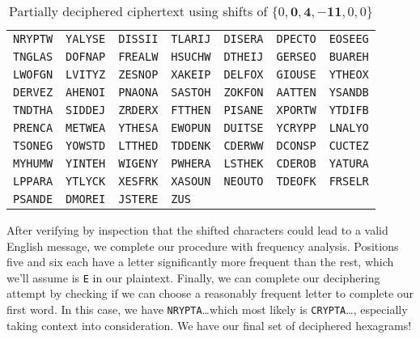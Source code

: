 \documentclass[12pt]{article}
\theoremstyle{remark}  %
\begin{document}
    \begin{table}[h]
        \begin{center}
            \begin{tabular}{lllllll}
                \texttt{NRYPTW} & \texttt{YALYSE} & \texttt{DISSII} & \texttt{TLARIJ} & \texttt{DISERA} & \texttt{DPECTO} & \texttt{EOSEEG} \\
                \texttt{TNGLAS} & \texttt{DOFNAP} & \texttt{FREALW} & \texttt{HSUCHW} & \texttt{DTHEIJ} & \texttt{GERSEO} & \texttt{BUAREH} \\
                \texttt{LWOFGN} & \texttt{LVITYZ} & \texttt{ZESNOP} & \texttt{XAKEIP} & \texttt{DELFOX} & \texttt{GIOUSE} & \texttt{YTHEOX} \\
                \texttt{DERVEZ} & \texttt{AHENOI} & \texttt{PNAONA} & \texttt{SASTOH} & \texttt{ZOKFON} & \texttt{AATTEN} & \texttt{YSANDB} \\
                \texttt{TNDTHA} & \texttt{SIDDEJ} & \texttt{ZRDERX} & \texttt{FTTHEN} & \texttt{PISANE} & \texttt{XPORTW} & \texttt{YTDIFB} \\
                \texttt{PRENCA} & \texttt{METWEA} & \texttt{YTHESA} & \texttt{EWOPUN} & \texttt{DUITSE} & \texttt{YCRYPP} & \texttt{LNALYO} \\
                \texttt{TSONEG} & \texttt{YOWSTD} & \texttt{LTTHED} & \texttt{TDDENK} & \texttt{CDERWW} & \texttt{DCONSP} & \texttt{CUCTEZ} \\
                \texttt{MYHUMW} & \texttt{YINTEH} & \texttt{WIGENY} & \texttt{PWHERA} & \texttt{LSTHEK} & \texttt{CDEROB} & \texttt{YATURA} \\
                \texttt{LPPARA} & \texttt{YTLYCK} & \texttt{XESFRK} & \texttt{XASOUN} & \texttt{NEOUTO} & \texttt{TDEOFK} & \texttt{FRSELR} \\
                \texttt{PSANDE} & \texttt{DMOREI} & \texttt{JSTERE} & \texttt{ZUS} & & & \\
            \end{tabular}
        \end{center}
        \captionsetup{labelformat=empty}
        \caption*{Partially deciphered ciphertext using shifts of $\{0,\mathbf{0},\mathbf{4},\mathbf{-11},0,0\}$}
    \end{table}
    After verifying by inspection that the shifted characters could lead to a valid English message, we complete our procedure with frequency analysis. Positions five and six each have a letter significantly more frequent than the rest, which we'll assume is \texttt{E} in our plaintext. Finally, we can complete our deciphering attempt by checking if we can choose a reasonably frequent letter to complete our first word. In this case, we have \texttt{NRYPTA}\dots which most likely is \texttt{CRYPTA}\dots , especially taking context into consideration. We have our final set of deciphered hexagrams!
\end{document}
